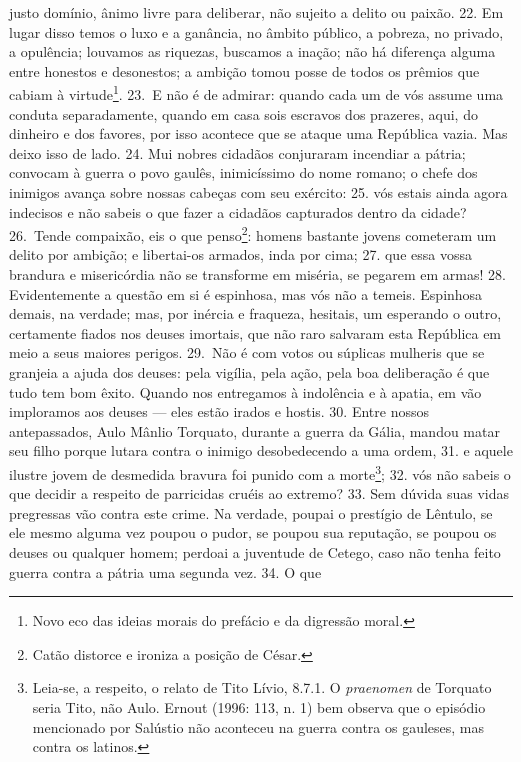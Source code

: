justo domínio, ânimo livre para deliberar, não sujeito a delito ou paixão. 22.
Em lugar disso temos o luxo e a ganância, no âmbito público, a pobreza, no
privado, a opulência; louvamos as riquezas, buscamos a inação; não há diferença
alguma entre honestos e desonestos; a ambição tomou posse de todos os prêmios
que cabiam à virtude\footnote{Novo eco das ideias morais do prefácio  e da
digressão moral.}. 23.~E não é de admirar: quando cada um de vós assume uma
conduta separadamente, quando em casa sois escravos dos prazeres, aqui, do
dinheiro e dos favores, por isso acontece que se ataque uma República vazia.
Mas deixo isso de lado. 24. Mui nobres cidadãos conjuraram incendiar a pátria;
convocam à guerra o povo gaulês, inimicíssimo do nome romano; o chefe dos
inimigos avança sobre nossas cabeças com seu exército: 25. vós estais ainda
agora indecisos e não sabeis o que fazer a cidadãos capturados dentro da
cidade? 26.~Tende compaixão, eis o que penso\footnote{Catão distorce e ironiza
a posição de César.}: homens bastante jovens cometeram um delito por ambição; e
libertai-os armados, inda por cima; 27. que essa vossa brandura e misericórdia
não se transforme em miséria, se pegarem em armas! 28. Evidentemente a questão
em si é espinhosa, mas vós não a temeis. Espinhosa demais, na verdade; mas, por
inércia e fraqueza, hesitais, um esperando o outro, certamente fiados
nos deuses imortais, que não raro salvaram esta República em meio a seus
maiores perigos. 29.~Não é com votos ou súplicas mulheris que se granjeia a
ajuda dos deuses: pela vigília, pela ação, pela boa deliberação é que tudo tem
bom êxito. Quando nos entregamos à indolência e à apatia, em vão imploramos aos
deuses --- eles estão irados e hostis. 30. Entre nossos antepassados, Aulo
Mânlio Torquato, durante a guerra da Gália, mandou matar seu filho porque
lutara contra o inimigo desobedecendo a uma ordem, 31. e aquele ilustre jovem
de desmedida bravura foi punido com a morte\footnote{Leia-se, a respeito, o
relato de Tito Lívio, 8.7.1. O \emph{praenomen} de Torquato seria Tito, não
Aulo. Ernout (1996: 113, n. 1) bem observa que o episódio mencionado por
Salústio não aconteceu na guerra contra os gauleses, mas contra os latinos.};
32. vós não sabeis o que decidir a respeito de parricidas cruéis ao extremo?
33. Sem dúvida suas vidas pregressas vão contra este crime. Na verdade, poupai
o prestígio de Lêntulo, se ele mesmo alguma vez poupou o pudor, se poupou sua
reputação, se poupou os deuses ou qualquer homem; perdoai a juventude de
Cetego, caso não tenha feito guerra contra a pátria uma segunda vez. 34. O que
